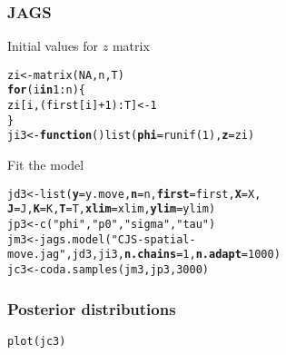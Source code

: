 \documentclass[color=usenames,dvipsnames]{beamer}\usepackage[]{graphicx}\usepackage[]{color}
\makeatletter
\newcommand{\hlnum}[1]{\textcolor[rgb]{0.69,0.494,0}{#1}}%
\newcommand{\hlstr}[1]{\textcolor[rgb]{0.749,0.012,0.012}{#1}}%
\newcommand{\hlopt}[1]{\textcolor[rgb]{0,0,0}{#1}}%
\newcommand{\hlstd}[1]{\textcolor[rgb]{0,0,0}{#1}}%
\newcommand{\hlkwa}[1]{\textcolor[rgb]{0,0,0}{\textbf{#1}}}%
\newcommand{\hlkwb}[1]{\textcolor[rgb]{0,0.341,0.682}{#1}}%
\newcommand{\hlkwc}[1]{\textcolor[rgb]{0,0,0}{\textbf{#1}}}%
\newcommand{\hlkwd}[1]{\textcolor[rgb]{0.004,0.004,0.506}{#1}}%
\newenvironment{kframe}{%
 \def\at@end@of@kframe{}%
 \ifinner\ifhmode%
  \def\at@end@of@kframe{\end{minipage}}%
  \begin{minipage}{\columnwidth}%
 \fi\fi%
 \def\FrameCommand##1{\hskip\@totalleftmargin \hskip-\fboxsep
 \colorbox{shadecolor}{##1}\hskip-\fboxsep
     \hskip-\linewidth \hskip-\@totalleftmargin \hskip\columnwidth}%
 \MakeFramed {\advance\hsize-\width
   \@totalleftmargin\z@ \linewidth\hsize
   \@setminipage}}%
 {\par\unskip\endMakeFramed%
 \at@end@of@kframe}
\newenvironment{knitrout}{}{} %
\makeatother
\begin{document}
\begin{frame}[fragile]
  \frametitle{JAGS}
  Initial values for $z$ matrix
\begin{knitrout}\scriptsize
{}\color{fgcolor}\begin{kframe}
\begin{alltt}
\hlstd{zi} \hlkwb{<-} \hlkwd{matrix}\hlstd{(}\hlnum{NA}\hlstd{, n, T)}
\hlkwa{for}\hlstd{(i} \hlkwa{in} \hlnum{1}\hlopt{:}\hlstd{n) \{}
    \hlstd{zi[i,(first[i]}\hlopt{+}\hlnum{1}\hlstd{)}\hlopt{:}\hlstd{T]} \hlkwb{<-} \hlnum{1}
    \hlstd{\}}
\hlstd{ji3} \hlkwb{<-} \hlkwa{function}\hlstd{()} \hlkwd{list}\hlstd{(}\hlkwc{phi}\hlstd{=}\hlkwd{runif}\hlstd{(}\hlnum{1}\hlstd{),} \hlkwc{z}\hlstd{=zi)}
\end{alltt}
\end{kframe}
\end{knitrout}
  \pause
  \vfill
  \large Fit the model
\begin{knitrout}
\color{fgcolor}\begin{kframe}
\begin{alltt}
\hlstd{jd3} \hlkwb{<-} \hlkwd{list}\hlstd{(}\hlkwc{y}\hlstd{=y.move,} \hlkwc{n}\hlstd{=n,} \hlkwc{first}\hlstd{=first,} \hlkwc{X}\hlstd{=X,}
            \hlkwc{J}\hlstd{=J,} \hlkwc{K}\hlstd{=K,} \hlkwc{T}\hlstd{=T,} \hlkwc{xlim}\hlstd{=xlim,} \hlkwc{ylim}\hlstd{=ylim)}
\hlstd{jp3} \hlkwb{<-} \hlkwd{c}\hlstd{(}\hlstr{"phi"}\hlstd{,} \hlstr{"p0"}\hlstd{,} \hlstr{"sigma"}\hlstd{,} \hlstr{"tau"}\hlstd{)}
\hlstd{jm3} \hlkwb{<-} \hlkwd{jags.model}\hlstd{(}\hlstr{"CJS-spatial-move.jag"}\hlstd{, jd3, ji3,} \hlkwc{n.chains}\hlstd{=}\hlnum{1}\hlstd{,} \hlkwc{n.adapt}\hlstd{=}\hlnum{1000}\hlstd{)}
\hlstd{jc3} \hlkwb{<-} \hlkwd{coda.samples}\hlstd{(jm3, jp3,} \hlnum{3000}\hlstd{)}
\end{alltt}
\end{kframe}
\end{knitrout}
\end{frame}









\begin{frame}[fragile]
  \frametitle{Posterior distributions}
\begin{knitrout}
\color{fgcolor}\begin{kframe}
\begin{alltt}
\hlkwd{plot}\hlstd{(jc3)}
\end{alltt}


{\ttfamily\noindent\bfseries\color{errorcolor}{\#\# Error in plot(jc3): object 'jc3' not found}}\end{kframe}
\end{knitrout}
\end{frame}
\end{document}
